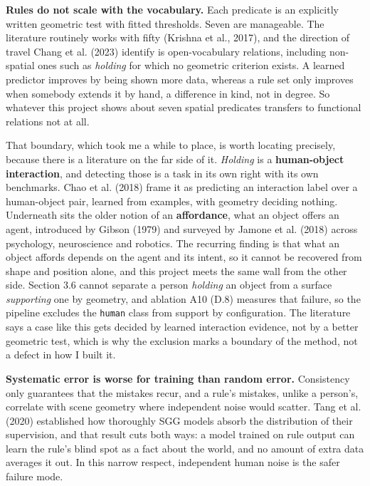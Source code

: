 \textbf{Rules do not scale with the vocabulary.} Each predicate is an explicitly written geometric test with fitted thresholds. Seven are manageable. The literature routinely works with fifty (Krishna et al., 2017), and the direction of travel Chang et al. (2023) identify is open-vocabulary relations, including non-spatial ones such as \textit{holding} for which no geometric criterion exists. A learned predictor improves by being shown more data, whereas a rule set only improves when somebody extends it by hand, a difference in kind, not in degree. So whatever this project shows about seven spatial predicates transfers to functional relations not at all.

That boundary, which took me a while to place, is worth locating precisely, because there is a literature on the far side of it. \textit{Holding} is a \textbf{human-object interaction}, and detecting those is a task in its own right with its own benchmarks. Chao et al. (2018) frame it as predicting an interaction label over a human-object pair, learned from examples, with geometry deciding nothing. Underneath sits the older notion of an \textbf{affordance}, what an object offers an agent, introduced by Gibson (1979) and surveyed by Jamone et al. (2018) across psychology, neuroscience and robotics. The recurring finding is that what an object affords depends on the agent and its intent, so it cannot be recovered from shape and position alone, and this project meets the same wall from the other side. Section 3.6 cannot separate a person \textit{holding} an object from a surface \textit{supporting} one by geometry, and ablation A10 (D.8) measures that failure, so the pipeline excludes the \texttt{human} class from support by configuration. The literature says a case like this gets decided by learned interaction evidence, not by a better geometric test, which is why the exclusion marks a boundary of the method, not a defect in how I built it.

\textbf{Systematic error is worse for training than random error.} Consistency only guarantees that the mistakes recur, and a rule's mistakes, unlike a person's, correlate with scene geometry where independent noise would scatter. Tang et al. (2020) established how thoroughly SGG models absorb the distribution of their supervision, and that result cuts both ways: a model trained on rule output can learn the rule's blind spot as a fact about the world, and no amount of extra data averages it out. In this narrow respect, independent human noise is the safer failure mode.

